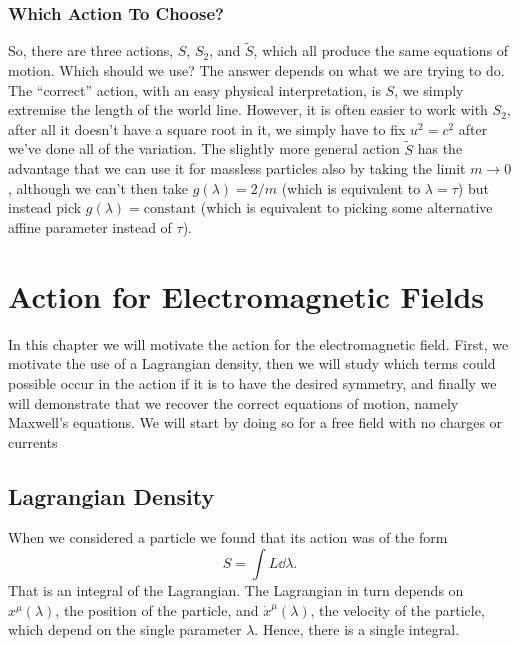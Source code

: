 \documentclass[fleqn]{NotesClass}
\newcommand*{\lagrangian}{L}
\begin{document}
    \subsection{Which Action To Choose?}
    So, there are three actions, \(S\), \(S_2\), and \(\tilde{S}\), which all produce the same equations of motion.
    Which should we use?
    The answer depends on what we are trying to do.
    The \enquote{correct} action, with an easy physical interpretation, is \(S\), we simply extremise the length of the world line.
    However, it is often easier to work with \(S_2\), after all it doesn't have a square root in it, we simply have to fix \(u^2 = c^2\) after we've done all of the variation.
    The slightly more general action \(\tilde{S}\) has the advantage that we can use it for massless particles also by taking the limit \(m \to 0\), although we can't then take \(g(\lambda) = 2/m\) (which is equivalent to \(\lambda = \tau\)) but instead pick \(g(\lambda) = \text{constant}\) (which is equivalent to picking some alternative affine parameter instead of \(\tau\)).
    
    \chapter{Action for Electromagnetic Fields}
    In this chapter we will motivate the action for the electromagnetic field.
    First, we motivate the use of a Lagrangian density, then we will study which terms could possible occur in the action if it is to have the desired symmetry, and finally we will demonstrate that we recover the correct equations of motion, namely Maxwell's equations.
    We will start by doing so for a free field with no charges or currents
    
    \section{Lagrangian Density}
    When we considered a particle we found that its action was of the form
    \begin{equation}
        S = \int \lagrangian \dd{\lambda}.
    \end{equation}
    That is an integral of the Lagrangian.
    The Lagrangian in turn depends on \(x^\mu(\lambda)\), the position of the particle, and \(\dot{x}^\mu(\lambda)\), the velocity of the particle, which depend on the single parameter \(\lambda\).
    Hence, there is a single integral.
    
\end{document}
